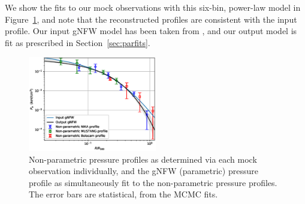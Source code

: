 \documentclass[onecolumn,traditabstract]{aa}
\begin{document}
We show the fits to our mock observations with this six-bin, power-law model in Figure~\ref{fig:virt_robustness},
and note that the reconstructed profiles are consistent with the input profile. Our input gNFW model has been taken
from \citet{romero2017}, and our output model is fit as prescribed in Section~\ref{sec:parfits}.




\begin{figure}[!h]
  \centering
  \includegraphics[width=0.5\textwidth]{NIKA_ml_deproj_figs/Virt_Joint_gNFW_Power_Virt_11011111_2500S_500B_100W_gNFW_pressure_w_NP_pts_p16cosmo_input_vs_output_v2.eps}
  \caption{Non-parametric pressure profiles as determined via each mock observation individually,
    and the gNFW (parametric) pressure profile as simultaneously fit to the non-parametric pressure profiles.
    The error bars are statistical, from the MCMC fits.}
  \label{fig:virt_robustness}
\end{figure}
\end{document}
